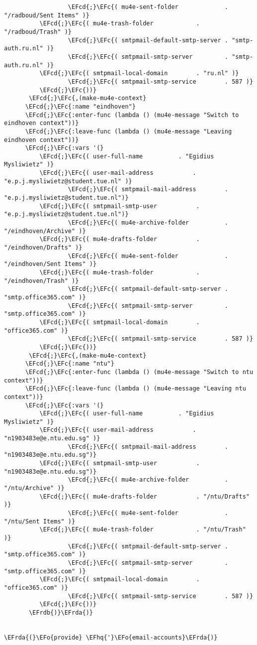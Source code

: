 \documentclass[a4wide,10pt]{article}
\newcommand{\EFc}[1]{\textcolor{EFc}{#1}} %
\newcommand{\EFcd}[1]{\textcolor{EFcd}{#1}} %
\newcommand{\EFo}[1]{\textcolor{EFo}{#1}} %
\newcommand{\EFhq}[1]{\textcolor{EFhq}{#1}} %
\newcommand{\EFrda}[1]{\textcolor{EFrda}{#1}} %
\newcommand{\EFrdb}[1]{\textcolor{EFrdb}{#1}} %
\begin{document}
\begin{Code}
\begin{Verbatim}
                  \EFcd{;}\EFc{( mu4e-sent-folder             . "/radboud/Sent Items" )}
		  \EFcd{;}\EFc{( mu4e-trash-folder            . "/radboud/Trash" )}
                  \EFcd{;}\EFc{( smtpmail-default-smtp-server . "smtp-auth.ru.nl" )}
                  \EFcd{;}\EFc{( smtpmail-smtp-server         . "smtp-auth.ru.nl" )}
		  \EFcd{;}\EFc{( smtpmail-local-domain        . "ru.nl" )}
                  \EFcd{;}\EFc{( smtpmail-smtp-service        . 587 )}
		  \EFcd{;}\EFc{))}
       \EFcd{;}\EFc{,(make-mu4e-context}
	  \EFcd{;}\EFc{:name "eindhoven"}
	  \EFcd{;}\EFc{:enter-func (lambda () (mu4e-message "Switch to eindhoven context"))}
	  \EFcd{;}\EFc{:leave-func (lambda () (mu4e-message "Leaving eindhoven context"))}
	  \EFcd{;}\EFc{:vars '(}
		  \EFcd{;}\EFc{( user-full-name	         . "Egidius Mysliwietz" )}
		  \EFcd{;}\EFc{( user-mail-address	         . "e.p.j.mysliwietz@student.tue.nl" )}
                  \EFcd{;}\EFc{( smtpmail-mail-address        . "e.p.j.mysliwietz@student.tue.nl")}
		  \EFcd{;}\EFc{( smtpmail-smtp-user           . "e.p.j.mysliwietz@student.tue.nl")}
                  \EFcd{;}\EFc{( mu4e-archive-folder          . "/eindhoven/Archive" )}
		  \EFcd{;}\EFc{( mu4e-drafts-folder           . "/eindhoven/Drafts" )}
                  \EFcd{;}\EFc{( mu4e-sent-folder             . "/eindhoven/Sent Items" )}
		  \EFcd{;}\EFc{( mu4e-trash-folder            . "/eindhoven/Trash" )}
                  \EFcd{;}\EFc{( smtpmail-default-smtp-server . "smtp.office365.com" )}
                  \EFcd{;}\EFc{( smtpmail-smtp-server         . "smtp.office365.com" )}
		  \EFcd{;}\EFc{( smtpmail-local-domain        . "office365.com" )}
                  \EFcd{;}\EFc{( smtpmail-smtp-service        . 587 )}
		  \EFcd{;}\EFc{))}
       \EFcd{;}\EFc{,(make-mu4e-context}
	  \EFcd{;}\EFc{:name "ntu"}
	  \EFcd{;}\EFc{:enter-func (lambda () (mu4e-message "Switch to ntu context"))}
	  \EFcd{;}\EFc{:leave-func (lambda () (mu4e-message "Leaving ntu context"))}
	  \EFcd{;}\EFc{:vars '(}
		  \EFcd{;}\EFc{( user-full-name	         . "Egidius Mysliwietz" )}
		  \EFcd{;}\EFc{( user-mail-address	         . "n1903483e@e.ntu.edu.sg" )}
                  \EFcd{;}\EFc{( smtpmail-mail-address        . "n1903483e@e.ntu.edu.sg")}
		  \EFcd{;}\EFc{( smtpmail-smtp-user           . "n1903483e@e.ntu.edu.sg")}
                  \EFcd{;}\EFc{( mu4e-archive-folder          . "/ntu/Archive" )}
		  \EFcd{;}\EFc{( mu4e-drafts-folder           . "/ntu/Drafts" )}
                  \EFcd{;}\EFc{( mu4e-sent-folder             . "/ntu/Sent Items" )}
		  \EFcd{;}\EFc{( mu4e-trash-folder            . "/ntu/Trash" )}
                  \EFcd{;}\EFc{( smtpmail-default-smtp-server . "smtp.office365.com" )}
                  \EFcd{;}\EFc{( smtpmail-smtp-server         . "smtp.office365.com" )}
		  \EFcd{;}\EFc{( smtpmail-local-domain        . "office365.com" )}
                  \EFcd{;}\EFc{( smtpmail-smtp-service        . 587 )}
		  \EFcd{;}\EFc{))}
       \EFrdb{)}\EFrda{)}


\EFrda{(}\EFo{provide} \EFhq{'}\EFo{email-accounts}\EFrda{)}
\end{Verbatim}
\end{Code}
\end{document}
